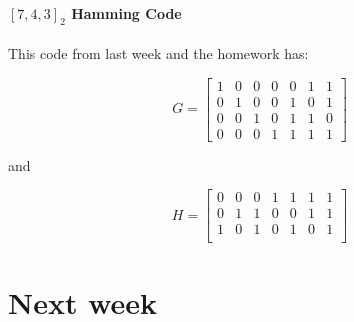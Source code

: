 \documentclass{idc_msc}
\begin{document}
\paragraph{\([7,4,3]_2\) Hamming Code}

This code from last week and the homework has:

\[
G =
\begin{bmatrix}
  1 & 0 & 0 & 0 & 0 & 1 & 1 \\
  0 & 1 & 0 & 0 & 1 & 0 & 1 \\
  0 & 0 & 1 & 0 & 1 & 1 & 0 \\
  0 & 0 & 0 & 1 & 1 & 1 & 1
\end{bmatrix}
\]

and

\[
H =
\begin{bmatrix}
  0 & 0 & 0 & 1 & 1 & 1 & 1 \\
  0 & 1 & 1 & 0 & 0 & 1 & 1 \\
  1 & 0 & 1 & 0 & 1 & 0 & 1 \\
\end{bmatrix}
\]

\section{Next week}
\end{document}
